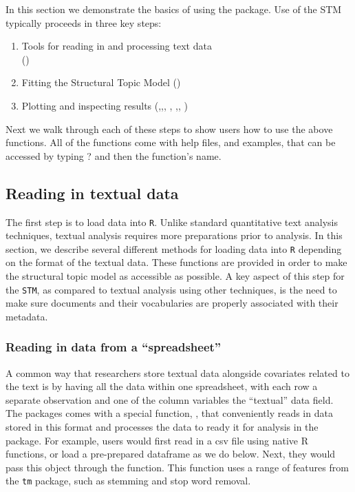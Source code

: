 \documentclass[nojss]{jss}
\begin{document}
In this section we demonstrate the basics of using the package. Use of the STM typically proceeds in three key steps:
\begin{enumerate}
\item Tools for reading in and processing text data \\
()\\
\item Fitting the Structural Topic Model
()
\item Plotting and inspecting results
(,,, , ,, )
\end{enumerate}

Next we walk through each of these steps to show users how to use the above functions. All of the functions come with help files, and examples, that can be accessed by typing ? and then the function's name. 

\subsection{Reading in textual data}

The first step is to load data into \texttt{R}. Unlike standard quantitative text analysis techniques, textual analysis requires more preparations prior to analysis. In this section, we describe several different methods for loading data into \texttt{R} depending on the format of the textual data. These functions are provided in order to make the structural topic model as accessible as possible. A key aspect of this step for the \texttt{STM}, as compared to textual analysis using other techniques, is the need to make sure documents and their vocabularies are properly associated with their metadata.

\subsubsection{Reading in data from a ``spreadsheet''}

A common way that researchers store textual data alongside covariates related to the text is by having all the data within one spreadsheet, with each row a separate observation and one of the column variables the ``textual'' data field. The  packages comes with a special function, , that conveniently reads in data stored in this format and processes the data to ready it for analysis in the  package. For example, users would first read in a csv file using native R functions, or load a pre-prepared dataframe as we do below. Next, they would pass this object through the  function. This function uses a range of features from the \texttt{tm} package, such as stemming and stop word removal.
\end{document}
